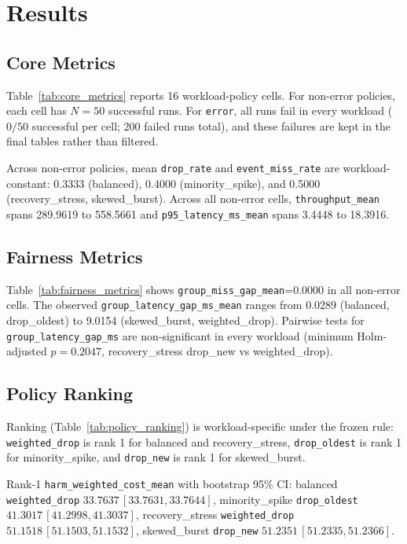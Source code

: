 \section{Results}
\subsection{Core Metrics}


Table~\ref{tab:core_metrics} reports 16 workload-policy cells.
For non-error policies, each cell has \(N=50\) successful runs.
For \texttt{error}, all runs fail in every workload (\(0/50\) successful per cell; 200 failed runs total),
and these failures are kept in the final tables rather than filtered.

Across non-error policies, mean \texttt{drop\_rate} and \texttt{event\_miss\_rate} are workload-constant:
0.3333 (balanced), 0.4000 (minority\_spike), and 0.5000 (recovery\_stress, skewed\_burst).
Across all non-error cells, \texttt{throughput\_mean} spans 289.9619 to 558.5661 and
\texttt{p95\_latency\_ms\_mean} spans 3.4448 to 18.3916.

\subsection{Fairness Metrics}


Table~\ref{tab:fairness_metrics} shows \texttt{group\_miss\_gap\_mean}=0.0000 in all non-error cells.
The observed \texttt{group\_latency\_gap\_ms\_mean} ranges from 0.0289 (balanced, drop\_oldest)
to 9.0154 (skewed\_burst, weighted\_drop).
Pairwise tests for \texttt{group\_latency\_gap\_ms} are non-significant in every workload
(minimum Holm-adjusted \(p=0.2047\), recovery\_stress drop\_new vs weighted\_drop).

\subsection{Policy Ranking}


Ranking (Table~\ref{tab:policy_ranking}) is workload-specific under the frozen rule:
\texttt{weighted\_drop} is rank 1 for balanced and recovery\_stress,
\texttt{drop\_oldest} is rank 1 for minority\_spike,
and \texttt{drop\_new} is rank 1 for skewed\_burst.

Rank-1 \texttt{harm\_weighted\_cost\_mean} with bootstrap 95\% CI:
balanced \texttt{weighted\_drop} \(33.7637\,[33.7631,33.7644]\),
minority\_spike \texttt{drop\_oldest} \(41.3017\,[41.2998,41.3037]\),
recovery\_stress \texttt{weighted\_drop} \(51.1518\,[51.1503,51.1532]\),
skewed\_burst \texttt{drop\_new} \(51.2351\,[51.2335,51.2366]\).

